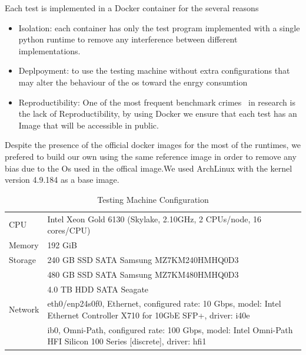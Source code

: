 Each test is implemented in a Docker container for the several reasons
\begin{itemize}
    \item Isolation: each container has only the test program implemented with a single python runtime to remove any interference between different implementations.
    \item Deplpoyment: to use the testing machine without extra configurations that may alter the behaviour of the os toward the enrgy consumtion
    \item Reproductibility: One of the most frequent benchmark crimes~\cite{DBLP:journals/corr/abs-1801-02381} in research is the lack of Reproductibility, by using Docker we ensure that each test has an Image that will be accessible in public.
\end{itemize}

Despite the presence of the official docker images for the most of the runtimes, we prefered to build our own using the same reference image in order to remove any bias due to the Os used in the offical image.We used ArchLinux with the kernel version 4.9.184 as a base image.

\begin{table}[hbt]
    \begin{tabular}{ll}
        \hline
        CPU     & Intel Xeon Gold 6130 (Skylake, 2.10GHz, 2 CPUs/node, 16 cores/CPU)                                                     \\
        Memory  & 192 GiB                                                                                                                \\
        Storage & 240 GB SSD SATA Samsung MZ7KM240HMHQ0D3                                                                                \\
                & 480 GB SSD SATA Samsung MZ7KM480HMHQ0D3                                                                                \\
                & 4.0 TB HDD SATA Seagate                                                                                                \\
        Network & eth0/enp24s0f0, Ethernet, configured rate: 10 Gbps, model: Intel Ethernet Controller X710 for 10GbE SFP+, driver: i40e \\
                & ib0, Omni-Path, configured rate: 100 Gbps, model: Intel Omni-Path HFI Silicon 100 Series [discrete], driver: hfi1      \\
        \hline
    \end{tabular}
    \caption{Testing Machine Configuration }
    \label{fig:dahuconfig}
\end{table}

